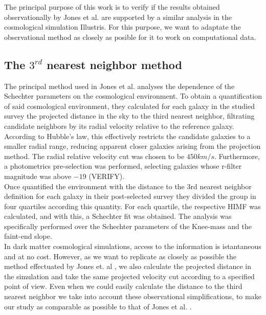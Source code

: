 \documentclass[a4paper,fleqn,usenatbib]{mnras}
\begin{document}
The principal purpose of this work is to verify if the results obtained observationally by Jones et al. \cite{jones1} are supported by a similar analysis in the cosmological simulation Illustris. For this purpose, we want to adaptate the observational method as closely as posible for it to work on computational data.\\

\subsection{The $3^{rd}$ nearest neighbor method}

The principal method used in Jones et al. \cite{jones1} analyses the dependence of the Schechter parameters on the cosmological environment. To obtain a quantification of said cosmological environment, they calculated for each galaxy in the studied survey the projected distance in the sky to the third nearest neighbor, filtrating candidate neighbors by its radial velocity relative to the reference galaxy. According to Hubble's law, this effectively restricts the candidate galaxies to a smaller radial range, reducing apparent closer galaxies arising from the projection method. The radial relative velocity cut was chosen to be $450km/s$. Furthermore, a photometrics pre-selection was performed, selecting galaxies whose r-filter magnitude was above $-19$ (VERIFY).\\

Once quantified the environment with the distance to the 3rd nearest neighbor definition for each galaxy in their post-selected survey they divided the group in four quartiles according this quantity. For each quartile, the respective HIMF was calculated, and with this, a Schechter fit was obtained. The analysis was specifically performed over the Schechter parameters of the Knee-mass and the faint-end slope. \\

In dark matter cosmological simulations, access to the information is istantaneous and at no cost. However, as we want to replicate as closely as possible the method effectuated by Jones et. al \cite{jones1}, we also calculate the projected distance in the simulation and take the same projected velocity cut according to a specified point of view. Even when we could easily calculate the distance to the third nearest neighbor we take into account these observational simplifications, to make our study as comparable as possible to that of Jones et al. \cite{jones1}.\\
\end{document}
